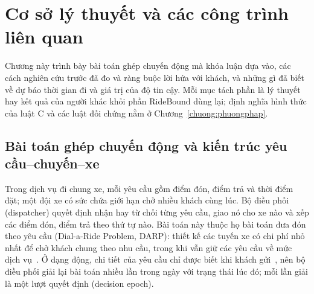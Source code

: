 
\chapter{Cơ sở lý thuyết và các công trình liên quan}
\label{chuong:coso}

Chương này trình bày bài toán ghép chuyến động mà khóa luận dựa vào, các cách nghiên cứu trước đã đo và ràng buộc
lời hứa với khách, và những gì đã biết về dự báo thời gian đi và giá trị của độ tin cậy. Mỗi mục tách phần là lý
thuyết hay kết quả của người khác khỏi phần RideBound dùng lại; định nghĩa hình thức của luật C và các luật đối chứng
nằm ở Chương~\ref{chuong:phuongphap}.

\section{Bài toán ghép chuyến động và kiến trúc yêu cầu--chuyến--xe}
\label{muc:c2-baitoan}

Trong dịch vụ đi chung xe, mỗi yêu cầu gồm điểm đón, điểm trả và thời điểm đặt; một đội xe có sức chứa giới hạn chở
nhiều khách cùng lúc. Bộ điều phối (dispatcher) quyết định nhận hay từ chối từng yêu cầu, giao nó cho xe nào và xếp
các điểm đón, điểm trả theo thứ tự nào. Bài toán này thuộc họ bài toán đưa đón theo yêu cầu (Dial-a-Ride Problem,
DARP): thiết kế các tuyến xe có chi phí nhỏ nhất để chở khách chung theo nhu cầu, trong khi vẫn giữ các yêu cầu về mức
dịch vụ~\cite{molenbruch2017}. Ở dạng động, chi tiết của yêu cầu chỉ được biết khi khách gửi~\cite{schulz2026}, nên
bộ điều phối giải lại bài toán nhiều lần trong ngày với trạng thái lúc đó; mỗi lần giải là một lượt quyết định
(decision epoch).

